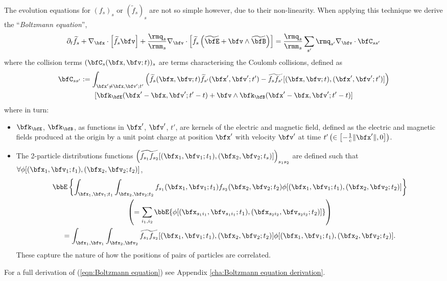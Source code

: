    The evolution equations for $(f_{s})_{s}$ or $(\widetilde{f}_{s})_{s}$ are not so simple however, due to their non-linearity. When applying this technique we derive the ``\emph{Boltzmann equation}'', \BA{[Ref]}
    \begin{equation}\label{eqn:Boltzmann equation}
        \partial_{t}\widetilde{f}_{s} + \nabla_{\bfx}\cdot\left[\widetilde{f}_{s}\bfv\right] + \frac{\rmq_{s}}{\rmm_{s}}\nabla_{\bfv}\cdot\left[\widetilde{f}_{s}\left(\widetilde{\bfE} + \bfv\wedge\widetilde{\bfB}\right)\right]  =   \frac{\rmq_{s}}{\rmm_{s}}\sum_{s'}\rmq_{s'}\nabla_{\bfv}\cdot\bfC_{ss'}
    \end{equation}
    where the collision terms $(\bfC_{s}(\bfx, \bfv; t))_{s}$ are terms characterising the Coulomb collisions, defined as
    \begin{multline}\label{eqn:collision operator}
        \bfC_{ss'}  :=  \int_{\bfx' \neq \bfx, \bfv'; t'}\left(\widetilde{f}_{s}(\bfx, \bfv; t)\widetilde{f}_{s'}(\bfx', \bfv'; t') - \widetilde{f_{s}f_{s'}}[(\bfx, \bfv; t), (\bfx', \bfv'; t')]\right)  \\
        [\bfk_{\bfE}(\bfx' - \bfx, \bfv'; t' - t) + \bfv\wedge\bfk_{\bfB}(\bfx' - \bfx, \bfv'; t' - t)]
    \end{multline}
    where in turn:
    \begin{itemize}
        \item  $\bfk_{\bfE}$, $\bfk_{\bfB}$, as functions in $\bfx'$, $\bfv'$, $t'$, are kernels of the electric and magnetic field, defined as the electric and magnetic fields produced at the origin by a unit point charge at position $\bfx'$ with velocity $\bfv'$ at time $t' \left(\in \left[-\frac{1}{c}\|\bfx'\|, 0\right]\right)$. 
        
        \item  The 2-particle distributions functions $\left(\widetilde{f_{s_{1}}f_{s_{2}}}[(\bfx_{1}, \bfv_{1}; t_{1}), (\bfx_{2}, \bfv_{2}; t_{s})]\right)_{s_{1}s_{2}}$ are defined such that $\forall \phi[(\bfx_{1}, \bfv_{1}; t_{1}), (\bfx_{2}, \bfv_{2}; t_{2})]$,
        \begin{multline}
            \bbE\left\{\int_{\bfx_{1}, \bfv_{1}; t_{1}}\int_{\bfx_{2}, \bfv_{2}; t_{2}}f_{s_{1}}(\bfx_{1}, \bfv_{1}; t_{1})f_{s_{2}}(\bfx_{2}, \bfv_{2}; t_{2})\phi[(\bfx_{1}, \bfv_{1}; t_{1}), (\bfx_{2}, \bfv_{2}; t_{2})]\right\}  \\
            \left(=  \sum_{i_{1}, i_{2}}\bbE\{\phi[(\bfx_{s_{1}i_{1}}, \bfv_{s_{1}i_{1}}; t_{1}), (\bfx_{s_{2}i_{2}}, \bfv_{s_{2}i_{2}}; t_{2})]\}\right)  \\
            =  \int_{\bfx_{1}, \bfv_{1}}\int_{\bfx_{2}, \bfv_{2}}\widetilde{f_{s_{1}}f_{s_{2}}}[(\bfx_{1}, \bfv_{1}; t_{1}), (\bfx_{2}, \bfv_{2}; t_{2})]\phi[(\bfx_{1}, \bfv_{1}; t_{1}), (\bfx_{2}, \bfv_{2}; t_{2})].
        \end{multline}
        These capture the nature of how the positions of pairs of particles are correlated.
    \end{itemize}
    For a full derivation of (\ref{eqn:Boltzmann equation}) see Appendix \ref{cha:Boltzmann equation derivation}.

